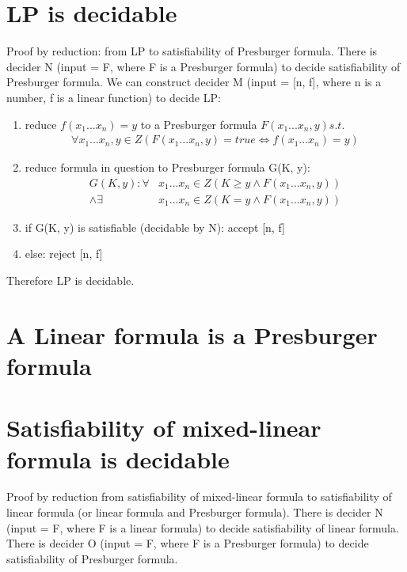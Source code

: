 \documentclass{article}
\begin{document}
\section{LP is decidable}
Proof by reduction: from LP to satisfiability of Presburger formula.
There is decider N (input = F, where F is a Presburger formula) to decide 
satisfiability of Presburger formula.
We can construct decider M (input = [n, f], where n is a number, 
f is a linear function) to decide LP:
\begin{enumerate}
	\item reduce $ f(x_1...x_n) = y $ to a Presburger formula $ F(x_1...x_n, y) 
	s.t. $
	\begin{align*}
		\forall x_1...x_n, y \in Z (F(x_1...x_n,y) = true \iff f(x_1...x_n) =y)
	\end{align*}
	\item reduce formula in question to Presburger formula G(K, y):
	\begin{align*}
		G(K, y): \forall& x_1 ... x_n \in Z(K \ge y \land F(x_1 ... x_n, y)) \\
		\land \exists& x_1 ... x_n \in Z (K = y \land F(x_1 ... x_n, y))
	\end{align*}
	\item if G(K, y) is satisfiable (decidable by N): accept [n, f]
	\item else: reject [n, f]
\end{enumerate}
Therefore LP is decidable.

\section{A Linear formula is a Presburger formula}

\section{Satisfiability of mixed-linear formula is decidable}

Proof by reduction from satisfiability of mixed-linear formula to 
satisfiability of linear formula (or linear formula and Presburger formula).
There is decider N (input = F, where F is a linear formula) to decide 
satisfiability of linear formula.
There is decider O (input = F, where F is a Presburger formula) to decide 
satisfiability of Presburger formula.
\end{document}
